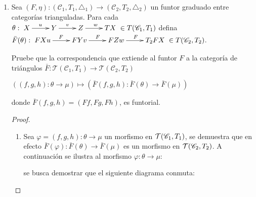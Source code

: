 \documentclass{article}
\begin{document}
\begin{enumerate}[label=\textbf{Ej \arabic*.}]
\begin{proof}
			Por lo que $(\mathscr{D},T|_\mathscr{D},\triangle|_\mathscr{D})^{op}$ es subcategoría triangulada de $(\mathscr{C},T,\triangle)^{op}$.
			
		\end{proof}
		\item Sea $(F,\eta):(\mathscr{C}_{1},T_{1},\triangle_{1})\to (\mathscr{C}_{2},T_{2},\triangle_{2})$ un funtor graduado entre categor\'ias trianguladas. Para cada $\theta : \xymatrix{X\ar[r]^u & Y\ar[r]^v & Z\ar[r]^w & TX } \in T(\mathscr{C}_{1},T_{1})$ defina $\bar{F}(\theta):\xymatrix{FX\ar[r]^Fu & FY\ar[r]^Fv & FZ\ar[r]^Fw & T_{2}FX } \in T(\mathscr{C}_{2},T_{2})$. 
		
		\bigskip
		
		Pruebe que la correspondencia que extiende al funtor $F$ a la categor\'ia de tri\'angulos $\bar{F} :\mathcal{T}(\mathscr{C}_{1},T_{1})\to \mathcal{T}(\mathscr{C}_{2},T_{2})$
		\begin{center}
			$((f,g,h):\theta \to \mu)\longmapsto (\bar{F}(f,g,h):\bar{F}(\theta)\to \bar{F}(\mu))$ 
		\end{center} 
		donde $\bar{F}(f,g,h)=(Ff,Fg,Fh)$, es funtorial.
		
		
		\begin{proof}
			\begin{enumerate}
				\item Sea $\varphi=(f,g,h):\theta \to \mu$ un morfismo en $\mathcal{T}(\mathscr{C}_{1},T_{1})$, se demuestra que en efecto $\bar{F}(\varphi):\bar{F}(\theta) \to \bar{F}(\mu)$ es un morfismo en $\mathcal{T}(\mathscr{C}_{2},T_{2})$. A continuación se ilustra al morfismo $\varphi:\theta \to \mu$:
				
				\begin{center}
				\end{center}
				
				se busca demostrar que el siguiente diagrama conmuta:
				
				\begin{center}
				\end{center}
				

\end{enumerate}
\end{proof}
\end{enumerate}
\end{document}
